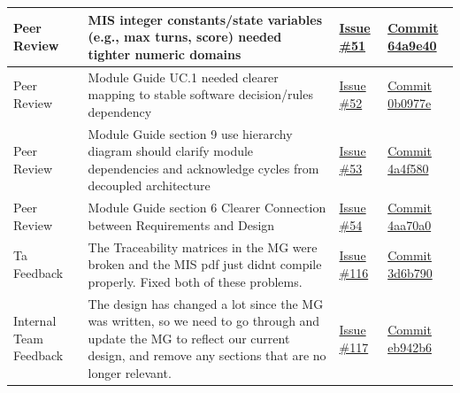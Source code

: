 \documentclass{article}
\begin{document}
\begin{landscape}
\begin{tabularx}{\linewidth}{|P{2.3cm}|Y|P{2.5cm}|P{3.5cm}|}
        \hline
        Peer Review &
        MIS integer constants/state variables (e.g., max turns, score) needed tighter numeric domains &
        \href{https://github.com/AlgoCatan/RLCatan/issues/51}{Issue \#51} &
        \href{https://github.com/AlgoCatan/RLCatan/commit/64a9e404d4ee43724bc3a08603f72db58f78df77}{Commit 64a9e40} \\

        \hline
        Peer Review &
        Module Guide UC.1 needed clearer mapping to stable software decision/rules dependency &
        \href{https://github.com/AlgoCatan/RLCatan/issues/52}{Issue \#52} &
        \href{https://github.com/AlgoCatan/RLCatan/commit/0b0977e662e96894e9aef643d61510918c1789a9}{Commit 0b0977e} \\

        \hline
        Peer Review &
        Module Guide section 9 use hierarchy diagram should clarify module dependencies and acknowledge cycles from decoupled architecture &
        \href{https://github.com/AlgoCatan/RLCatan/issues/53}{Issue \#53} &
        \href{https://github.com/AlgoCatan/RLCatan/commit/4a4f580d8d8217572d8f534f5bf5d651b84a5b51}{Commit 4a4f580} \\

        \hline
        Peer Review &
        Module Guide section 6 Clearer Connection between Requirements and Design &
        \href{https://github.com/AlgoCatan/RLCatan/issues/54}{Issue \#54} &
        \href{https://github.com/AlgoCatan/RLCatan/commit/4aa70a05f56cabdd9d2b5ad0f77149d595291913}{Commit 4aa70a0} \\

        \hline
        Ta Feedback &
        The Traceability matrices in the MG were broken and the MIS pdf just didnt compile properly. Fixed both of these problems. &
        \href{https://github.com/AlgoCatan/RLCatan/issues/116}{Issue \#116} &
        \href{https://github.com/AlgoCatan/RLCatan/commit/3d6b7901f6120db67a177b9fd7a04db081f1b6ae}{Commit 3d6b790} \\

        \hline
        Internal Team Feedback &
        The design has changed a lot since the MG was written, so we need to go through and update the MG to reflect our current design, and remove any sections that are no longer relevant. &
        \href{https://github.com/AlgoCatan/RLCatan/issues/117}{Issue \#117} &
        \href{https://github.com/AlgoCatan/RLCatan/commit/eb942b6e09e321dd0b32b431bcb68783ddef34f5}{Commit eb942b6} \\


\end{tabularx}
\end{landscape}
\end{document}
